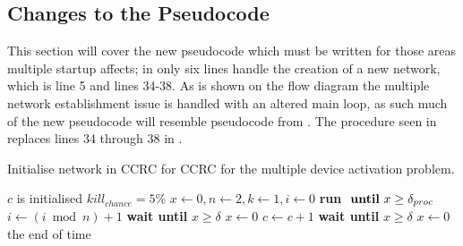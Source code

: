 \subsection{Changes to the Pseudocode}
This section will cover the new pseudocode which must be written for those areas multiple startup affects; in  only six lines handle the creation of a new network, which is line 5 and lines 34-38.
As is shown on the flow diagram  the multiple network establishment issue is handled with an altered main loop, as such much of the new pseudocode will resemble pseudocode from .
The procedure seen in  replaces lines 34 through 38 in . 
\begin{algorithm}
\caption{Initialise network in CCRC for CCRC for the multiple device activation problem.}
\label{lst:networkMultiStartCCRC2}
\begin{algorithmic}[1]
\Require $c$ is initialised 
\Require $kill_{chance} = 5\%$ 
    \State $x \gets 0, n \gets 2, k \gets 1, i \gets 0$
    \Repeat {}
        \State \textbf{run}  $\text{ \textbf{until} }x \ge \delta_{proc}$
        \State $i \gets (i \bmod n) + 1$ 
            \State {} 
            \State {}
        \Else
                    \State {}
                    \State {}
                        \State \textbf{wait until } $x \ge \delta$  
                        \State $x \gets 0$
                        \State {}
                    \EndIf
                \Else
                     
                        \State $c \gets c + 1$
                        \State {} 
                    \EndIf
                \EndIf
            \EndWhile
        \EndIf
        \State \textbf{wait until } $x \ge \delta$  
        \State $x \gets 0$
    \Until the end of time
\EndProcedure    
\end{algorithmic}
\end{algorithm}

